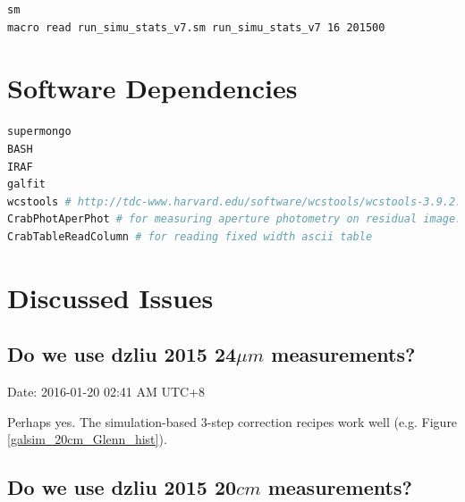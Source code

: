 \documentclass[11pt,a4paper]{article}
\begin{document}
\begin{lstlisting}[language=bash]
sm
macro read run_simu_stats_v7.sm run_simu_stats_v7 16 201500
\end{lstlisting}


\clearpage

\appendix

\section{Software Dependencies}
\label{Appendix_Software_Dependencies}

\begin{lstlisting}[language=bash]
supermongo
BASH
IRAF
galfit
wcstools # http://tdc-www.harvard.edu/software/wcstools/wcstools-3.9.2.tar.gz
CrabPhotAperPhot # for measuring aperture photometry on residual image. TODO: github url
CrabTableReadColumn # for reading fixed width ascii table
\end{lstlisting}


\clearpage

\section{Discussed Issues}
\label{Appendix_DiscussedIssues}

\subsection{Do we use dzliu 2015 24${\mu}m$ measurements?}

\textcolor{green!90!black!60!orange}{Date: 2016-01-20 02:41 AM UTC+8}

Perhaps yes. The simulation-based 3-step correction recipes work well (e.g. Figure \ref{galsim_20cm_Glenn_hist}). 

\subsection{Do we use dzliu 2015 20$cm$ measurements?}
\end{document}
